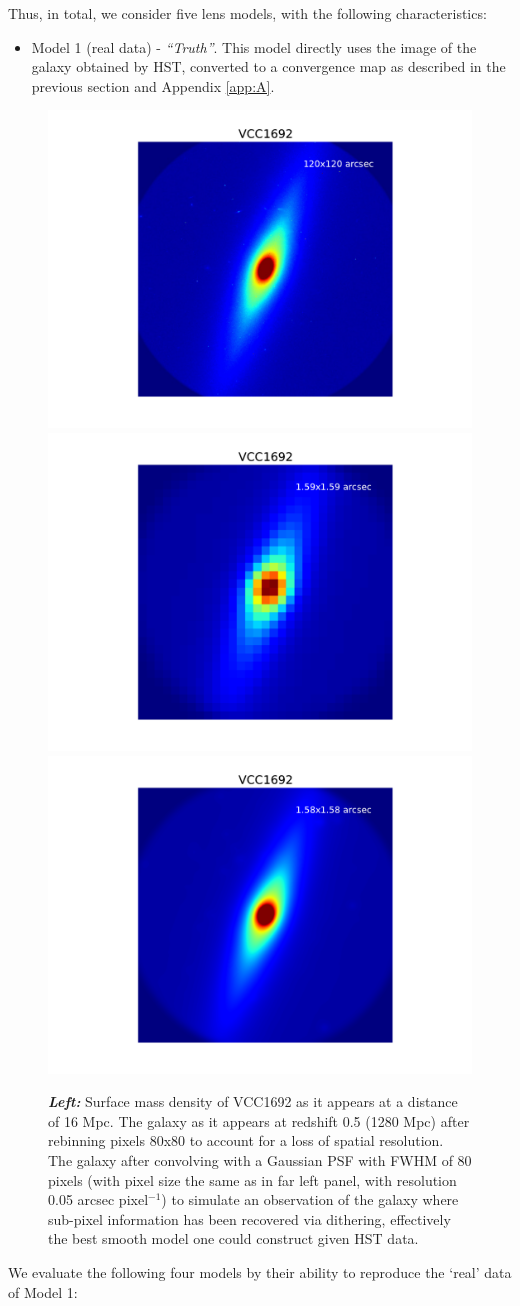 Thus, in total, we consider five lens models, with the following
characteristics:

\begin{itemize}
	\item Model 1 (real data) - \textit{``Truth''}. This model directly uses the image of the galaxy obtained by HST, converted to a convergence map as described in the previous section and Appendix \ref{app:A}. 
\end{itemize}
\begin{figure}
	\centering
	\includegraphics[clip,trim=4.1cm 1.5cm 4.1cm 2cm,width=.325\textwidth]{./figures_sls/baryonmap_truth-eps-converted-to.pdf}
	\includegraphics[clip,trim=4.1cm 1.5cm 4.1cm 2cm,width=.325\textwidth]{./figures_sls/baryonmap_RealHST-eps-converted-to.pdf}
	\includegraphics[clip,trim=4.1cm 1.5cm 4.1cm 2cm,width=.325\textwidth]{./figures_sls/baryonmap_smoothed-eps-converted-to.pdf}
	\caption[Maps of surface mass density]{\label{fig:VCC1692real_vs_mods}{\bf{\emph{Left:}}} Surface mass density of VCC1692 as it appears at a distance of 16 Mpc.  The galaxy as it appears at redshift 0.5 (1280 Mpc) after rebinning pixels 80x80 to account for a loss of spatial resolution.   The galaxy after convolving with a Gaussian PSF with FWHM of 80 pixels (with pixel size the same as in far left panel, with resolution 0.05 arcsec pixel$^{-1}$) to simulate an observation of the galaxy where sub-pixel information has been recovered via dithering, effectively the best smooth model one could construct given HST data.}
\end{figure}
\noindent We evaluate the following four models by their ability to reproduce the `real' data of Model 1:

